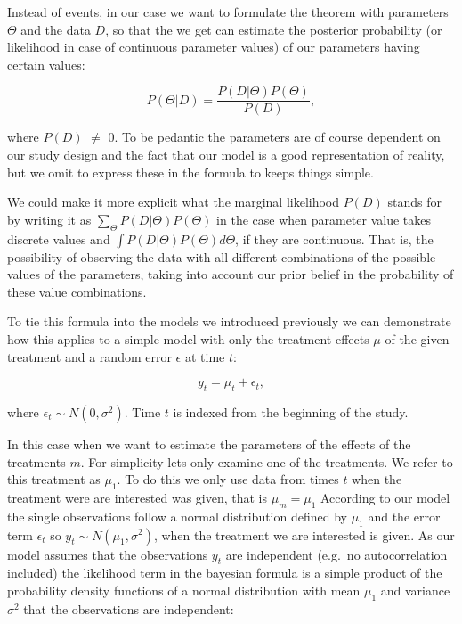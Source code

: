 \documentclass[12pt,a4paper,leqno]{report}
\theoremstyle{plain}
\theoremstyle{definition}
\theoremstyle{remark}
\begin{document}
Instead of events, in our case we want to formulate the theorem with parameters \(\Theta \)
and the data \(D\), so that the we get can estimate the posterior
probability (or likelihood in case of continuous parameter values) of our parameters having certain values:

\begin{def}\label{}
    \begin{equation}
        P(\Theta|D) = \frac{P(D|\Theta)P(\Theta)}{P(D)},
    \end{equation}
\end{def}where \(P(D)\) \(\neq \) 0. To be pedantic the parameters are of course dependent
on our study design and the fact that our model is a good representation of reality, but
we omit to express these in the formula to keeps things simple.

We could make it more explicit what the marginal likelihood \(P(D)\) stands for by
writing it as \(\sum_\Theta P(D|\Theta)P(\Theta)\) in the case when parameter value takes discrete values
and \(\int P(D|\Theta)P(\Theta) d\Theta \), if they are continuous. That is, the possibility of
observing the data with all different combinations of the possible values of the parameters,
taking into account our prior belief in the probability of these value combinations.

To tie this formula into the models we introduced previously we can demonstrate how this
applies to a simple model with only the treatment effects \(\mu \) of the given treatment
and a random error \(\epsilon \) at time \(t\):

\begin{def}\label{}
    \begin{equation}\label{}
        y_t = \mu_t + \epsilon_t,
    \end{equation}
\end{def}where \(\epsilon_{t} \sim N(0,\sigma^2)\). Time \(t\) is indexed from the
beginning of the study.

In this case when we want to estimate the parameters of the effects of the treatments \(m\).
For simplicity lets only examine one of the treatments. We refer to this treatment as \(\mu_1 \).
To do this we only use data from times \(t\) when the treatment were are interested was given, that is \(\mu_m=\mu_1\)
According to our model the single observations follow a normal distribution defined by \(\mu_1 \)
and the error term \(\epsilon_t \) so \(y_t \sim N(\mu_1,\sigma^2) \), when the treatment we are
interested is given. As our model assumes that the observations \(y_t\) are independent
(e.g.\ no autocorrelation included) the likelihood term in the bayesian
formula is a simple product of the probability density functions of
a normal distribution with mean \(\mu_1 \) and variance \(\sigma^2 \)
that the observations are independent:
\end{document}
